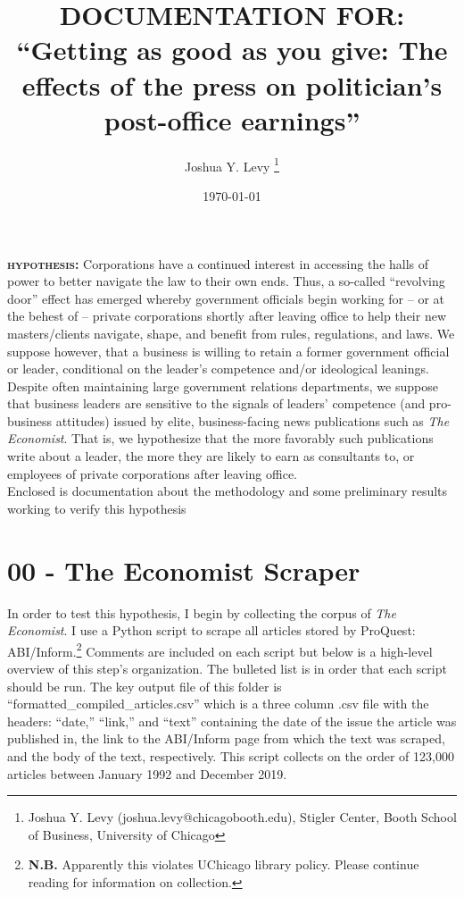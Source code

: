 \documentclass[11pt, letterpaper, twoside]{article}
\title{\singlespacing\textbf{DOCUMENTATION FOR: ``Getting as good as you give: The effects of the press on politician's post-office earnings''}}
\author{Joshua Y. Levy \thanks{Joshua Y. Levy  (joshua.levy@chicagobooth.edu), Stigler Center, Booth School of Business, University of Chicago}}
\date{\today}
\begin{document}
\begin{titlepage}
    \maketitle
    \thispagestyle{empty}
\end{titlepage}


\newpage
{}

\textsc{\textbf{hypothesis: }}Corporations have a continued interest in accessing the halls of power to better navigate the law to their own ends. Thus, a so-called ``revolving door'' effect has emerged whereby government officials begin working for -- or at the behest of -- private corporations shortly after leaving office to help their new masters/clients navigate, shape, and benefit from rules, regulations, and laws. We suppose however, that a business is willing to retain a former government official or leader, conditional on the leader's competence and/or ideological leanings. Despite often maintaining large government relations departments, we suppose that business leaders are sensitive to the signals of leaders' competence (and pro-business attitudes) issued by elite, business-facing news publications such as \textit{The Economist}. That is, we hypothesize that the more favorably such publications write about a leader, the more they are likely to earn as consultants to, or employees of private corporations after leaving office.\\

Enclosed is documentation about the methodology and some preliminary results working to verify this hypothesis

\section{00 - The Economist Scraper}

In order to test this hypothesis, I begin by collecting the corpus of \textit{The Economist}. I use a Python script to scrape all articles stored by ProQuest: ABI/Inform.\footnote{\textbf{N.B.} Apparently this violates UChicago library policy. Please continue reading for information on collection.} Comments are included on each script but below is a high-level overview of this step's organization. The bulleted list is in order that each script should be run. The key output file of this folder is ``formatted\_compiled\_articles.csv'' which is a three column .csv file with the headers: ``date,'' ``link,'' and ``text'' containing the date of the issue the article was published in, the link to the ABI/Inform page from which the text was scraped, and the body of the text, respectively. This script collects on the order of 123,000 articles between January 1992 and December 2019.
\end{document}
